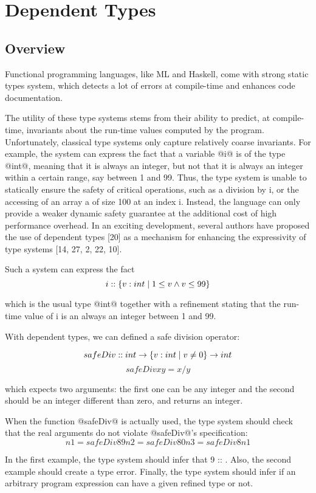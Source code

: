 \section{Dependent Types}

\subsection{Overview}

Functional programming languages, like ML and Haskell,
come with strong static types system, which detects a lot 
of errors at compile-time and enhances code documentation.


The utility of these type systems stems from their ability to predict, 
at compile-time, invariants about the run-time values computed by the program. 
%
Unfortunately, classical type systems only
capture relatively coarse invariants. For example, the system can
express the fact that a variable @i@ is of the type @int@, 
meaning that it is always an integer, but not that it is always an integer within a
certain range, say between 1 and 99. 
%
Thus, the type system is unable to statically ensure the safety of critical operations, 
such as a division by i, or the accessing of an array a of size 100 at an index
i. 
%
Instead, the language can only provide a weaker dynamic safety
guarantee at the additional cost of high performance overhead.
In an exciting development, several authors have proposed the
use of dependent types [20] as a mechanism for enhancing the
expressivity of type systems [14, 27, 2, 22, 10]. 

Such a system can
express the fact
$$ i :: \left\lbrace v : int\mid 1 \leq v  \land v \leq  99\right\rbrace $$

which is the usual type @int@ together with a refinement stating that
the run-time value of i is an always an integer between 1 and 99.

With dependent types, we can defined a safe division operator:

$$
safeDiv :: int -> \left\lbrace v : int\mid v \neq 0\right\rbrace -> int
$$
$$
safeDiv x y = x / y
$$

which expects two arguments: the first one can be any integer
and the second should be an integer different than zero, and
returns an integer.

When the function @safeDiv@ is actually used, 
the type system should check that the real arguments do not
violate @safeDiv@'s specification:
$$
n1 = safeDiv 8 9
n2 = safeDiv 8 0
n3 = safeDiv 8 n1
$$
 
 
In the first example, the type system should infer that 9 :: .
Also, the second example should create a type error.
Finally, the type system should infer if an arbitrary program expression
can have a given refined type or not.


